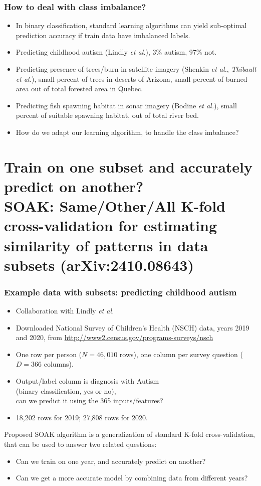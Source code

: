 \documentclass[t]{beamer}
\begin{document}
\begin{frame}
  \frametitle{How to deal with class imbalance?}
  \begin{itemize}
  \item In binary classification, standard learning algorithms can yield sub-optimal prediction accuracy if train data have imbalanced labels.
  \item Predicting childhood autism (Lindly \emph{et al.}), 3\% autism, 97\% not.
  \item Predicting presence of trees/burn in satellite imagery
    (Shenkin \emph{et al.}, \emph{Thibault} \emph{et al.}), small
    percent of trees in deserts of Arizona, small percent of burned
    area out of total forested area in Quebec.
  \item Predicting fish spawning habitat in sonar imagery (Bodine
    \emph{et al.}), small percent of suitable spawning habitat, out of
    total river bed.
  \item How do we adapt our learning algorithm, to handle the class imbalance?
  \end{itemize}
\end{frame}

\section{Train on one subset and accurately predict on another? \\ SOAK: Same/Other/All K-fold cross-validation for estimating similarity of patterns in data subsets (arXiv:2410.08643)}

\begin{frame}
  \frametitle{Example data with subsets: predicting childhood autism}

  \begin{itemize}
  \item Collaboration with Lindly \emph{et al.}
  \item Downloaded National Survey of Children's Health (NSCH) data,
    years 2019 and 2020, from
    \url{http://www2.census.gov/programs-surveys/nsch}
  \item One row per person ($N=46,010$ rows), one column per survey question ($D=366$ columns). 
  \item Output/label column is diagnosis with Autism\\
    (binary classification, yes or no),\\
    can we predict it using the 365 inputs/features? 
  \item 18,202 rows for 2019; 27,808 rows for 2020.
  \end{itemize}
  Proposed SOAK algorithm is a generalization of standard K-fold cross-validation, that can be used to answer two related questions:
  \begin{itemize}
  \item Can we train on one year, and accurately predict on another?
  \item Can we get a more accurate model by combining data from different years?
  \end{itemize}

\end{frame} 
\end{document}
